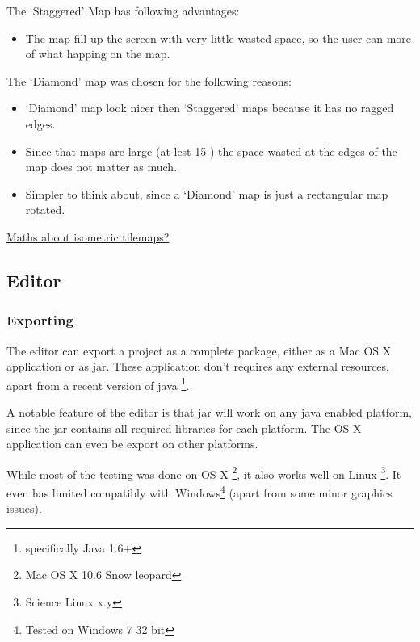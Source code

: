 The `Staggered' Map has following advantages:
\begin{itemize}
	\item The map fill up the screen with very little wasted space, so the user can more of what happing on the map.
\end{itemize} 

The `Diamond' map was chosen for the following reasons:
\begin{itemize}
	\item `Diamond' map look nicer then `Staggered' maps because it has no ragged edges.
	\item Since that maps are large (at lest 15 ) the space wasted at the edges of the map does not matter as much.
	\item Simpler to think about, since a `Diamond' map is just a rectangular map rotated.
\end{itemize}

\underline{Maths about isometric tilemaps? }



\subsection{Editor}

\subsubsection{Exporting}
The editor can export a project as a complete package, either as a Mac OS X application or as jar. These application don't requires any external resources, apart from a recent version of java \footnote{specifically Java 1.6+}.

A notable feature of the editor is that jar will work on any java enabled platform, since the jar contains all required libraries for each platform. The OS X application can even be export on other platforms.

While most of the testing was done on OS X \footnote{Mac OS X 10.6 Snow leopard}, it also works well on Linux \footnote{Science  Linux x.y}. It even has limited compatibly with Windows\footnote{Tested on Windows 7 32 bit} (apart from some minor graphics issues).